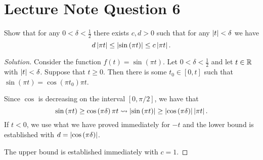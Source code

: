 \section{Lecture Note Question 6}
\horz

Show that for any $0 < \delta < \frac{1}{2}$ there exists $c,d > 0$ such that for any $\left\lvert t \right\rvert < \delta$ we have
\begin{equation*}
d\left\lvert \pi t \right\rvert \le \left\lvert \sin \left( \pi t \right) \right\rvert \le c \left\lvert \pi t \right\rvert.
\end{equation*}

\horz
\begin{proof} [Solution]
Consider the function $f(t)= \sin \left( \pi t \right)$. Let $0< \delta < \frac{1}{2}$ and let $t \in \mathbb R$ with $\left\lvert t \right\rvert < \delta$. Suppose that $t\ge 0$. Then there is some $t_{0} \in [0, t]$ such that $\sin \left( \pi t \right) = \cos \left( \pi t_{0} \right) \pi t$.

Since $\cos$ is decreasing on the interval $[0, \pi /2 ]$, we have that 
\begin{equation*}
\sin \left( \pi t \right) \ge \cos \left( \pi \delta \right) \pi t \leadsto \left\lvert \sin \left( \pi t \right) \right\rvert \ge \left\lvert \cos \left( \pi \delta \right) \right\rvert \left\lvert \pi t \right\rvert.
\end{equation*}
If $t<0$, we use what we have proved immediately for $-t$ and the lower bound is established with $d=\left\lvert \cos \left( \pi \delta \right) \right\rvert$. 

The upper bound is established immediately with $c=1$.
\end{proof}
